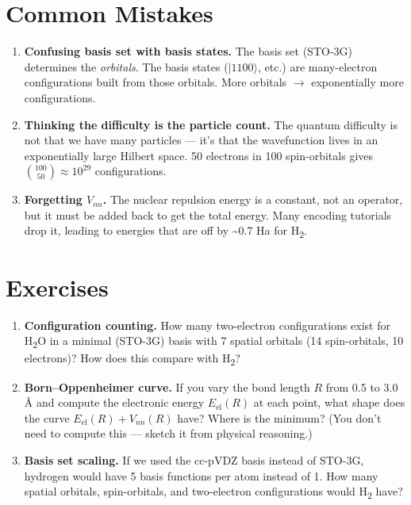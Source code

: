 \documentclass[
  11pt,
  oneside]{book}
\begin{document}
\section{Common Mistakes}\label{common-mistakes}

\begin{enumerate}
\def\labelenumi{\arabic{enumi}.}
\item
  \textbf{Confusing basis set with basis states.} The basis set (STO-3G)
  determines the \emph{orbitals}. The basis states
  (\(\lvert 1100\rangle\), etc.) are many-electron configurations built
  from those orbitals. More orbitals $\rightarrow$ exponentially more
  configurations.
\item
  \textbf{Thinking the difficulty is the particle count.} The quantum
  difficulty is not that we have many particles --- it's that the
  wavefunction lives in an exponentially large Hilbert space. 50
  electrons in 100 spin-orbitals gives
  \(\binom{100}{50} \approx 10^{29}\) configurations.
\item
  \textbf{Forgetting \(V_{nn}\).} The nuclear repulsion energy is a
  constant, not an operator, but it must be added back to get the total
  energy. Many encoding tutorials drop it, leading to energies that are
  off by \textasciitilde0.7 Ha for H\textsubscript{2}.
\end{enumerate}

\section{Exercises}\label{exercises}

\begin{enumerate}
\def\labelenumi{\arabic{enumi}.}
\item
  \textbf{Configuration counting.} How many two-electron configurations
  exist for H\textsubscript{2}O in a minimal (STO-3G) basis with 7 spatial orbitals (14
  spin-orbitals, 10 electrons)? How does this compare with H\textsubscript{2}?
\item
  \textbf{Born--Oppenheimer curve.} If you vary the bond length \(R\)
  from 0.5 to 3.0 Å and compute the electronic energy \(E_\text{el}(R)\)
  at each point, what shape does the curve
  \(E_\text{el}(R) + V_{nn}(R)\) have? Where is the minimum? (You don't
  need to compute this --- sketch it from physical reasoning.)
\item
  \textbf{Basis set scaling.} If we used the cc-pVDZ basis instead of
  STO-3G, hydrogen would have 5 basis functions per atom instead of 1.
  How many spatial orbitals, spin-orbitals, and two-electron
  configurations would H\textsubscript{2} have?
\end{enumerate}
\end{document}
